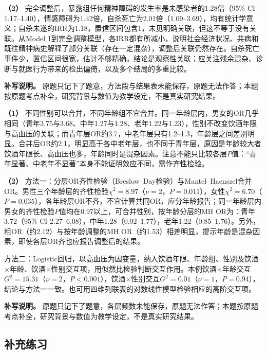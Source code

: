 \textbf{（2）} 完全调整后，暴露组任何精神障碍的发生率是未感染者的1.28倍（95\% CI 1.17--1.40），情感障碍为1.42倍，自杀死亡为2.01倍（1.09--3.69），均有统计学意义；自杀未遂的IRR为1.18，置信区间包含1，未见明确关联，但这不等于没有关联。从Model 1到完全调整模型，各IRR都有所减小，说明社会经济状况、共病和既往精神病史解释了部分关联（存在一定混杂），调整后关联仍然存在。自杀死亡事件少，置信区间很宽，估计不够精确。结论是观察性关联；应关注残余混杂、诊断与就医行为带来的检出偏倚，以及多个结局的多重比较。

\textbf{补写说明。} 原题只记下了题意，方法段与结果表未能保存，原题无法作答；本题按原题考点补全，研究背景与数值为教学设定，不是真实研究结果。



\textbf{（1）} 不同性别可以合并，不同年龄组不宜合并。同一年龄层内，男女的OR几乎相同（青年3.75与3.68、中年1.27与1.28、老年1.22与1.23），性别不改变饮酒年限与高血压的关联；而青年层OR约3.7，中老年层只有1.2--1.3，年龄层之间差别明显。合并后OR约2.1，明显高于各中老年层，也不同于青年层，原因是年龄较大者饮酒年限长、高血压也多，年龄同时是混杂因素。注意不能只比较各层\(P\)值：``青年显著、中老年不显著''本身不能证明效应不同，需作齐性检验。

\textbf{（2）} 方法一：分层OR齐性检验（Breslow--Day检验）与Mantel--Haenszel合并OR。男性三个年龄层的齐性检验\(\chi^2=8.97\)（\(\nu=2\)，\(P=0.011\)），女性\(\chi^2=6.70\)（\(P=0.035\)），各年龄层OR不齐，不宜计算共同OR，应分年龄报告；同一年龄层内男女的齐性检验\(P\)值均在0.97以上，可合并性别，按年龄分层的MH OR为：青年3.72（95\% CI 2.27--6.08），中年1.28（0.92--1.77），老年1.22（0.85--1.76）。另外，粗OR（约2.12）与按年龄调整的MH OR（约1.53）相差明显，提示年龄是混杂因素，即使各层OR齐也应报告调整后的结果。

方法二：Logistic回归，以高血压为因变量，纳入饮酒年限、年龄组、性别及饮酒\(\times\)年龄、饮酒\(\times\)性别交互项，用似然比检验判断交互作用。本例饮酒\(\times\)年龄交互\(G^2=15.31\)（\(\nu=2\)，\(P<0.001\)），饮酒\(\times\)性别交互\(G^2=0.01\)（\(\nu=1\)，\(P=0.94\)），结论与方法一一致。也可用四维列联表的对数线性模型检验相应的高阶交互项。

\textbf{补写说明。} 原题只记下了题意，各层频数未能保存，原题无法作答；本题按原题考点补全，研究背景与数值为教学设定，不是真实研究结果。


\subsection{补充练习}

